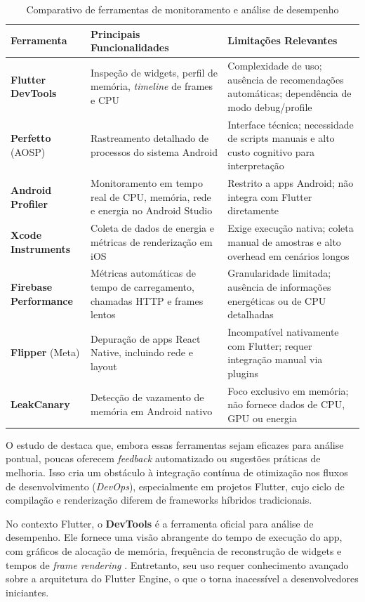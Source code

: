 \documentclass[12pt,a4paper,oneside]{abntex2}
\begin{document}
\begin{table}[H]
\centering
\caption{Comparativo de ferramentas de monitoramento e análise de desempenho}
\label{tab:ferramentas}
\begin{tabular}{p{3cm}p{5cm}p{7cm}}
\toprule
\textbf{Ferramenta} & \textbf{Principais Funcionalidades} & \textbf{Limitações Relevantes} \\ \midrule
\textbf{Flutter DevTools} & Inspeção de widgets, perfil de memória, \textit{timeline} de frames e CPU & Complexidade de uso; ausência de recomendações automáticas; dependência de modo debug/profile \\
\textbf{Perfetto} (AOSP) & Rastreamento detalhado de processos do sistema Android & Interface técnica; necessidade de scripts manuais e alto custo cognitivo para interpretação \\
\textbf{Android Profiler} & Monitoramento em tempo real de CPU, memória, rede e energia no Android Studio & Restrito a apps Android; não integra com Flutter diretamente \\
\textbf{Xcode Instruments} & Coleta de dados de energia e métricas de renderização em iOS & Exige execução nativa; coleta manual de amostras e alto overhead em cenários longos \\
\textbf{Firebase Performance} & Métricas automáticas de tempo de carregamento, chamadas HTTP e frames lentos & Granularidade limitada; ausência de informações energéticas ou de CPU detalhadas \\
\textbf{Flipper} (Meta) & Depuração de apps React Native, incluindo rede e layout & Incompatível nativamente com Flutter; requer integração manual via plugins \\
\textbf{LeakCanary} & Detecção de vazamento de memória em Android nativo & Foco exclusivo em memória; não fornece dados de CPU, GPU ou energia \\
\bottomrule
\end{tabular}
\end{table}

O estudo de \textcite{meyer2022performance} \cite{meyer2022performance} destaca que, embora essas ferramentas sejam eficazes para análise pontual, poucas oferecem \textit{feedback} automatizado ou sugestões práticas de melhoria. Isso cria um obstáculo à integração contínua de otimização nos fluxos de desenvolvimento (\textit{DevOps}), especialmente em projetos Flutter, cujo ciclo de compilação e renderização diferem de frameworks híbridos tradicionais.

No contexto Flutter, o \textbf{DevTools} é a ferramenta oficial para análise de desempenho. Ele fornece uma visão abrangente do tempo de execução do app, com gráficos de alocação de memória, frequência de reconstrução de widgets e tempos de \textit{frame rendering} \cite{google2024devtools}. Entretanto, seu uso requer conhecimento avançado sobre a arquitetura do Flutter Engine, o que o torna inacessível a desenvolvedores iniciantes.  
\end{document}
